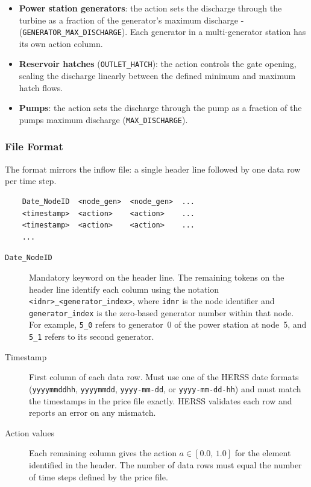 \documentclass[a4paper, 12pt]{report}
\begin{document}
	\begin{itemize}
	\item \textbf{Power station generators}: the action sets the discharge through the
	turbine as a fraction of the generator's maximum discharge - \\ 
	(\texttt{GENERATOR\_MAX\_DISCHARGE}). Each generator in a multi-generator station
	has its own action column.
	\item \textbf{Reservoir hatches} (\texttt{OUTLET\_HATCH}): the action controls the
	gate opening, scaling the discharge linearly between the defined minimum and
	maximum hatch flows.
    \item \textbf{Pumps}: the action sets the discharge through the
	pump as a fraction of the pumps maximum discharge (\texttt{MAX\_DISCHARGE}).
	\end{itemize}

	\subsubsection{File Format}

	The format mirrors the inflow file: a single header line followed by one data row per
	time step.

	\begin{verbatim}
	Date_NodeID  <node_gen>  <node_gen>  ...
	<timestamp>  <action>    <action>    ...
	<timestamp>  <action>    <action>    ...
	...
	\end{verbatim}


	\begin{description}
	\item[\texttt{Date\_NodeID}] Mandatory keyword on the header line. The remaining
	tokens on the header line identify each column using the notation
	\texttt{<idnr>\_<generator\_index>}, where \texttt{idnr} is the node identifier
	and \texttt{generator\_index} is the zero-based generator number within that
	node. For example, \texttt{5\_0} refers to generator~0 of the power station at
	node~5, and \texttt{5\_1} refers to its second generator.
	
	\item[Timestamp] First column of each data row. Must use one of the HERSS date
	formats (\texttt{yyyymmddhh}, \texttt{yyyymmdd}, \texttt{yyyy-mm-dd}, or
	\texttt{yyyy-mm-dd-hh}) and must match the timestamps in the price file exactly.
	HERSS validates each row and reports an error on any mismatch.
	
	\item[Action values] Each remaining column gives the action $a \in [0.0,\, 1.0]$
	for the element identified in the header. The number of data rows must equal
	the number of time steps defined by the price file.
	\end{description}
\end{document}
